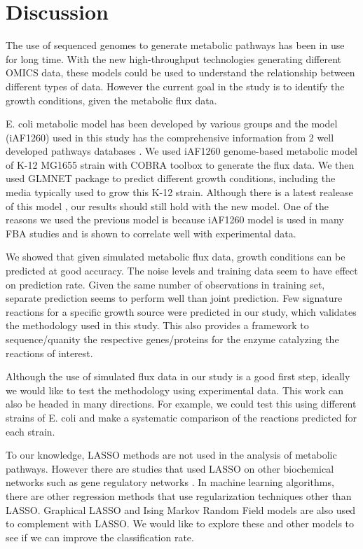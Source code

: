 \documentclass[12pt]{article}
\begin{document}
\section*{Discussion}

The use of sequenced genomes to generate metabolic pathways has been in use for long time. With the new high-throughput technologies generating different OMICS data, these models could be used to understand the relationship between different types of data. However the current goal in the study is to identify the growth conditions, given the metabolic flux data.

\bigskip
\noindent
E. coli metabolic model has been developed by various groups and the model (iAF1260) used in this study has the comprehensive information from 2 well developed pathways databases \cite{Keseleretal2013,Feistetal2007}. We used iAF1260 genome-based metabolic model of K-12 MG1655 strain with COBRA toolbox to generate the flux data. We then used GLMNET package to predict different growth conditions, including the media typically used to grow this K-12 strain. Although there is a latest realease of this model \cite{Orthetal2012}, our results should still hold with the new model. One of the reasons we used the previous model is because iAF1260 model is used in many FBA studies and is shown to correlate well with experimental data.

\bigskip
\noindent
We showed that given simulated metabolic flux data, growth conditions can be predicted at good accuracy. The noise levels and training data seem to have effect on prediction rate. Given the same number of observations in training set, separate prediction seems to perform well than joint prediction. Few signature reactions for a specific growth source were predicted in our study, which validates the methodology used in this study. This also provides a framework to sequence/quanity the respective genes/proteins for the enzyme catalyzing the reactions of interest.

\bigskip
\noindent
Although the use of simulated flux data in our study is a good first step, ideally we would like to test the methodology using experimental data. This work can also be headed in many directions. For example, we could test this using different strains of E. coli and make a systematic comparison of the reactions predicted for each strain.

\bigskip
\noindent
To our knowledge, LASSO methods are not used in the analysis of metabolic pathways. However there are studies that used LASSO on other biochemical networks such as gene regulatory networks \cite{Menendezetal2010}. In machine learning algorithms, there are other regression methods that use regularization techniques other than LASSO. Graphical LASSO \cite{Friedmanetal2008} and Ising Markov Random Field models \cite{Ravikumaretal2010} are also used to complement with LASSO. We would like to explore these and other models to see if we can improve the classification rate.
\end{document}
